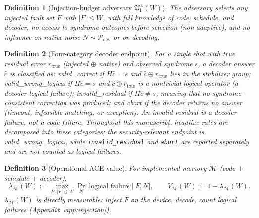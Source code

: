 \documentclass[pdflatex,sn-mathphys-num]{sn-jnl}
\theoremstyle{thmstyleone}
\theoremstyle{thmstyletwo}
\theoremstyle{thmstylethree}
\newtheorem{definition}{Definition}
\begin{document}
\begin{definition}[Injection-budget adversary $\mathfrak{A}_1^{\mathrm{st}}(W)$]\label{def:adversary}
The adversary selects any injected fault set $F$ with $|F|\le W$, with full knowledge of code, schedule, and decoder, no access to syndrome outcomes before selection (non-adaptive), and no influence on native noise $N\sim\mathcal{P}_{\mathrm{dev}}$ or on decoding.
\end{definition}

\begin{definition}[Four-category decoder endpoint]\label{def:endpoint}
For a single shot with true residual error $r_{\mathrm{true}}$ (injected $\oplus$ native) and observed syndrome $s$, a decoder answer $\hat c$ is classified as: \emph{valid\_correct} if $H\hat c=s$ and $\hat c\oplus r_{\mathrm{true}}$ lies in the stabilizer group; \emph{valid\_wrong\_logical} if $H\hat c=s$ and $\hat c\oplus r_{\mathrm{true}}$ is a nontrivial logical operator (a decoder logical failure); \emph{invalid\_residual} if $H\hat c\neq s$, meaning that no syndrome-consistent correction was produced; and \emph{abort} if the decoder returns no answer (timeout, infeasible matching, or exception). An invalid residual is a decoder failure, not a code failure. Throughout this manuscript, headline rates are decomposed into these categories; the security-relevant endpoint is \emph{valid\_wrong\_logical}, while \texttt{invalid\_residual} and \texttt{abort} are reported separately and are not counted as logical failures.
\end{definition}

\begin{definition}[Operational ACE value]\label{def:acevalue}
For implemented memory $\mathcal{M}$ (code $+$ schedule $+$ decoder),
\[
\lambda_{\mathcal{M}}(W):=\max_{F:\,|F|\le W}
\Pr_{N}\!\big[\text{logical failure}\mid F,N\big],
\qquad V_{\mathcal{M}}(W):=1-\lambda_{\mathcal{M}}(W).
\]
$\lambda_{\mathcal{M}}(W)$ is directly measurable: inject $F$ on the device, decode, count logical failures (Appendix~\ref{app:injection}).
\end{definition}
\end{document}
